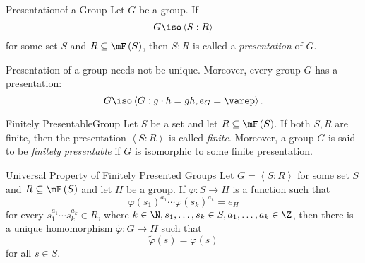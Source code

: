 \documentclass[pmath347]{subfiles}
\begin{document}
    \begin{definition}{Presentation}{of a Group}
        Let $G$ be a group. If
        \begin{equation*}
            G\iso\left< S:R \right>  
        \end{equation*}
        for some set $S$ and $R\subseteq\mF\left( S \right)$, then $S:R$ is called a \emph{presentation} of $G$.
    \end{definition}

    \noindent Presentation of a group needs not be unique. Moreover, every group $G$ has a presentation:
    \begin{equation*}
        G\iso \left< G: g\cdot h =gh, e_G=\varep \right> . 
    \end{equation*}

    \begin{definition}{Finitely Presentable}{Group}
        Let $S$ be a set and let $R\subseteq\mF\left( S \right)$. If both $S,R$ are finite, then the presentation $\left< S:R \right>$ is called \emph{finite}. Moreover, a group $G$ is said to be \emph{finitely presentable} if $G$ is isomorphic to some finite presentation.
    \end{definition}

    \begin{theorem}{Universal Property of Finitely Presented Groups}
        Let $G = \left< S:R \right>$ for some set $S$ and $R\subseteq\mF\left( S \right)$ and let $H$ be a group. If $\varphi:S\to H$ is a function such that
        \begin{equation*}
            \varphi\left( s_1 \right) ^{a_1}\cdots\varphi\left( s_k \right) ^{a_k} = e_H
        \end{equation*}
        for every $s_1^{a_1}\cdots s_k^{a_k}\in R$, where $k\in\N, s_1,\ldots,s_k\in S, a_1,\ldots,a_k\in\Z$, then there is a unique homomorphism $\tilde{\varphi}:G\to H$ such that
        \begin{equation*}
            \tilde{\varphi} \left( s \right) = \varphi\left( s \right) 
        \end{equation*}
        for all $s\in S$.
    \end{theorem}
\end{document}

